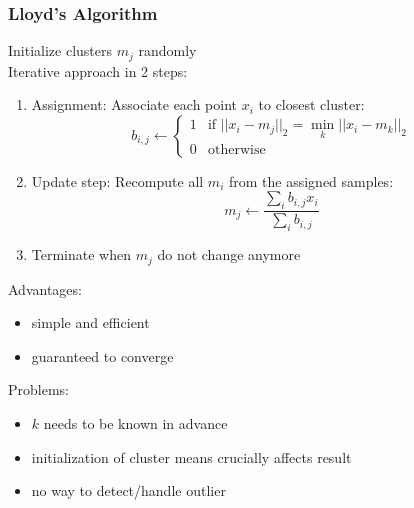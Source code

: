 \subsubsection{Lloyd's Algorithm}%
\label{ml:ssub:lloyds_algorithm}
Initialize clusters \(m_j\) randomly\\
Iterative approach in 2 steps:
\begin{enumerate}
\item Assignment: Associate each point \(x_i\) to closest cluster:
  \[
    b_{i, j} \leftarrow \begin{cases}1 & \text{if } || x_i - m_j ||_2 = \min_k || x_i - m_k ||_2\\
      0 & \text{otherwise}\end{cases}
  \]
\item Update step: Recompute all \(m_i\) from the assigned samples:
  \[
    m_j \leftarrow \frac{\sum_i b_{i,j} x_i}{\sum_i b_{i,j}}
  \]
\item Terminate when \(m_j\) do not change anymore
\end{enumerate}

Advantages:
\begin{itemize}
\item simple and efficient
\item guaranteed to converge
\end{itemize}
Problems:
\begin{itemize}
\item \(k\) needs to be known in advance
\item initialization of cluster means crucially affects result
\item no way to detect/handle outlier
\end{itemize}